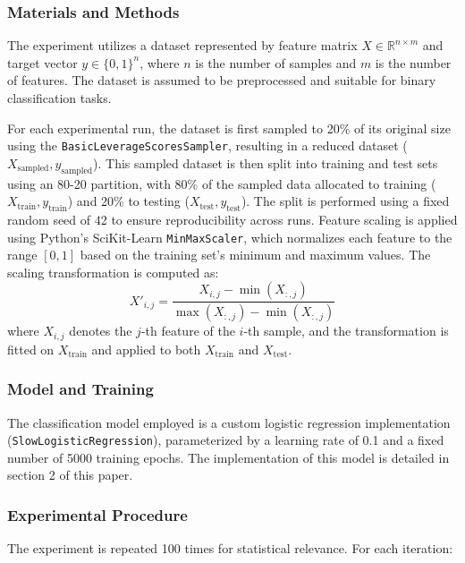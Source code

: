 \documentclass{article}
\theoremstyle{plain}
\theoremstyle{definition}
\theoremstyle{remark}
\begin{document}
\subsubsection{Materials and Methods}

The experiment utilizes a dataset represented by feature matrix $ X \in \mathbb{R}^{n \times m} $ and target vector $ y \in \{0, 1\}^n $, where $ n $ is the number of samples and $ m $ is the number of features. The dataset is assumed to be preprocessed and suitable for binary classification tasks.

For each experimental run, the dataset is first sampled to 20\% of its original size using the \texttt{BasicLeverageScoresSampler}, resulting in a reduced dataset ($ X_{\text{sampled}}, y_{\text{sampled}} $). This sampled dataset is then split into training and test sets using an 80-20 partition, with 80\% of the sampled data allocated to training ($ X_{\text{train}}, y_{\text{train}} $) and 20\% to testing ($ X_{\text{test}}, y_{\text{test}} $). The split is performed using a fixed random seed of 42 to ensure reproducibility across runs. Feature scaling is applied using Python's SciKit-Learn \texttt{MinMaxScaler}, which normalizes each feature to the range $[0, 1]$ based on the training set's minimum and maximum values. The scaling transformation is computed as:
\[
X'_{i,j} = \frac{X_{i,j} - \min(X_{:,j})}{\max(X_{:,j}) - \min(X_{:,j})}
\]
where $ X_{i,j} $ denotes the $ j $-th feature of the $ i $-th sample, and the transformation is fitted on $ X_{\text{train}} $ and applied to both $ X_{\text{train}} $ and $ X_{\text{test}} $.

\subsubsection{Model and Training}

The classification model employed is a custom logistic regression implementation (\texttt{SlowLogisticRegression}), parameterized by a learning rate of 0.1 and a fixed number of 5000 training epochs. The implementation of this model is detailed in section 2 of this paper.

\subsubsection{Experimental Procedure}

The experiment is repeated 100 times for statistical relevance. For each iteration:
\end{document}
